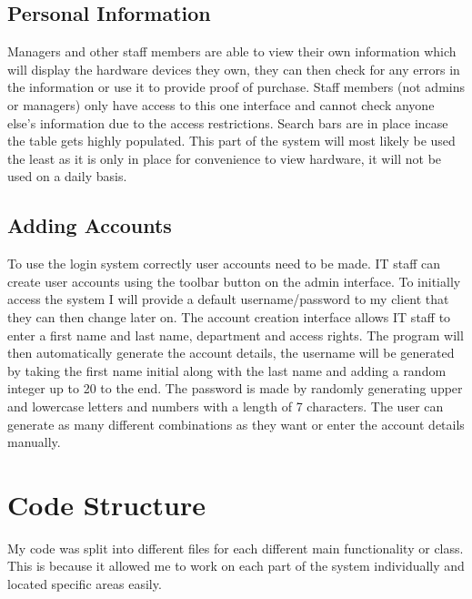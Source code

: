 \subsection{Personal Information}

Managers and other staff members are able to view their own information which will display the hardware devices they own, they can then check for any errors in the information or use it to provide proof of purchase. Staff members (not admins or managers) only have access to this one interface and cannot check anyone else's information due to the access restrictions. Search bars are in place incase the table gets highly populated. This part of the system will most likely be used the least as it is only in place for convenience to view hardware, it will not be used on a daily basis.

\subsection{Adding Accounts}

To use the login system correctly user accounts need to be made. IT staff can create user accounts using the toolbar button on the admin interface. To initially access the system I will provide a default username/password to my client that they can then change later on. The account creation interface allows IT staff to enter a first name and last name, department and access rights. The program will then automatically generate the account details, the username will be generated by taking the first name initial along with the last name and adding a random integer up to 20 to the end. The password is made by randomly generating upper and lowercase letters and numbers with a length of 7 characters. The user can generate as many different combinations as they want or enter the account details manually.

\section{Code Structure}

My code was split into different files for each different main functionality or class. This is because it allowed me to work on each part of the system individually and located specific areas easily.

